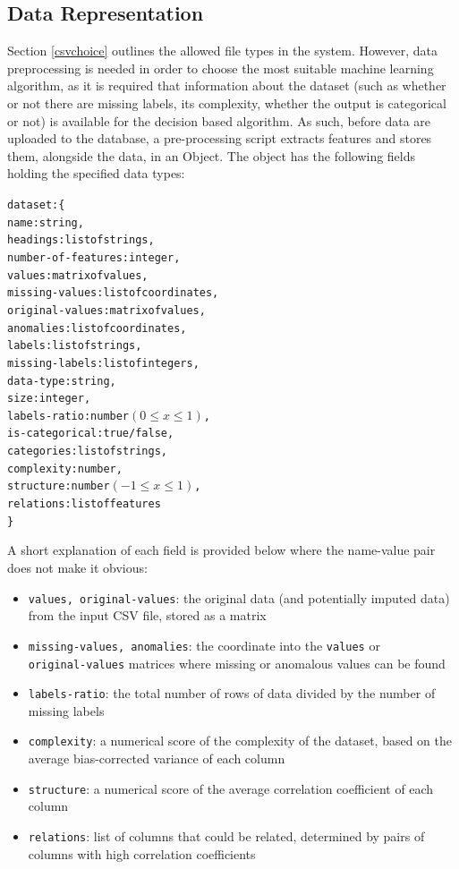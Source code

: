 \documentclass[a4paper,titlepage]{article}
\begin{document}
\subsection{Data Representation\label{datarepresentation}}
Section \ref{csvchoice} outlines the allowed file types in the system.
However, data preprocessing is needed in order to choose the most suitable machine learning algorithm, as it is required that information about the dataset (such as whether or not there are missing labels, its complexity, whether the output is categorical or not) is available for the decision based algorithm.
As such, before data are uploaded to the database, a pre-processing script extracts features and stores them, alongside the data, in an Object.
The object has the following fields holding the specified data types:

\begin{alltt}
  dataset: \{
    name: string,
    headings: list of strings,
    number-of-features: integer,
    values: matrix of values,
    missing-values: list of coordinates,
    original-values\footnotemark: matrix of values,
    anomalies: list of coordinates,
    labels: list of strings,
    missing-labels: list of integers,
    data-type: string,
    size: integer,
    labels-ratio: number \((0 \leq x \leq 1)\),
    is-categorical: true / false,
    categories\footnotemark: list of strings, 
    complexity: number,
    structure: number \((-1 \leq x \leq 1)\),
    relations: list of features
  \}
\end{alltt}

A short explanation of each field is provided below where the name-value pair does not make it obvious:
\begin{itemize}
  \item \verb|values, original-values|: the original data (and potentially imputed data) from the input CSV file, stored as a matrix
  \item \verb|missing-values, anomalies|: the coordinate into the \verb|values| or \\\verb|original-values| matrices where missing or anomalous values can be found
  \item \verb|labels-ratio|: the total number of rows of data divided by the number of missing labels
  \item \verb|complexity|: a numerical score of the complexity of the dataset, based on the average bias-corrected variance of each column
  \item \verb|structure|: a numerical score of the average correlation coefficient of each column
  \item \verb|relations|: list of columns that could be related, determined by pairs of columns with high correlation coefficients
\end{itemize}
\end{document}
